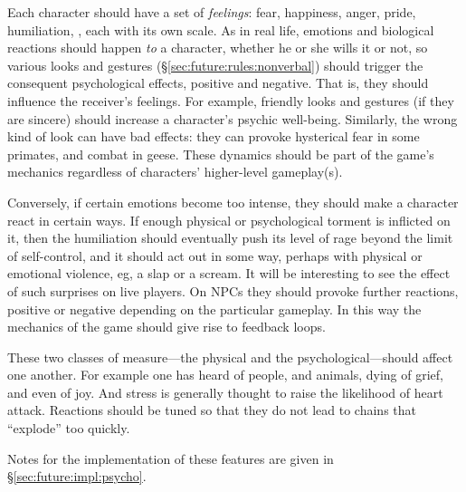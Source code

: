 Each character should have a set of {\em feelings}: fear, happiness,
anger, pride, humiliation, \etc, each with its own scale.  As in real
life, emotions and biological reactions should happen {\em to} a
character, whether he or she wills it or not, so various looks and
gestures (\S\ref{sec:future:rules:nonverbal}) should trigger the
consequent psychological effects, positive and negative.  That is,
they should influence the receiver's feelings.  For example, friendly
looks and gestures (if they are sincere) should increase a character's
psychic well-being.  Similarly, the wrong kind of look can have bad
effects: they can provoke hysterical fear in some primates, and combat
in geese.  These dynamics should be part of the game's mechanics
regardless of characters' higher-level gameplay(s).

Conversely, if certain emotions become too intense, they should make a
character react in certain ways.  If enough physical or psychological
torment is inflicted on it, then the humiliation should eventually
push its level of rage beyond the limit of self-control, and it should
act out in some way, perhaps with physical or emotional violence, eg,
a slap or a scream.  It will be interesting to see the effect of such
surprises on live players.  On NPCs they should provoke further
reactions, positive or negative depending on the particular gameplay.
In this way the mechanics of the game should give rise to feedback
loops.

These two classes of measure---the physical and the
psychological---should affect one another.
For example one has heard of people, and animals, dying of grief, and
even of joy.
And stress is generally thought to raise the likelihood of heart
attack. Reactions should be tuned so that they do not lead to chains
that ``explode'' too quickly.

Notes for the implementation of these features are given in
\S\ref{sec:future:impl:psycho}.
